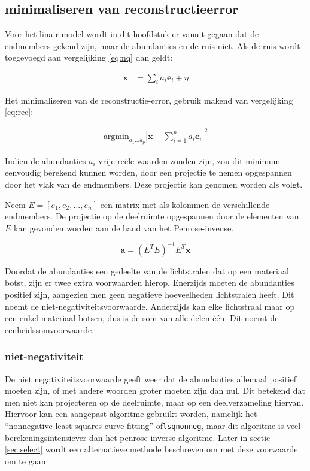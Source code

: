 \documentclass[12pt]{report}
\begin{document}
\subsection{minimaliseren van reconstructieerror}
Voor het linair model wordt in dit hoofdstuk er vanuit gegaan dat de endmembers gekend zijn, maar de abundanties en de ruis niet. Als de ruis wordt toegevoegd aan vergelijking \ref{eq:nq} dan geldt:

\begin{align}
\bm{x} &= \sum_i a_i \bm{e}_i + \eta
\end{align}

Het minimaliseren van de reconstructie-error, gebruik makend van vergelijking \ref{eq:rec}:

\begin{align}
\text{argmin}_{a_1 ... a_p} \left| \bm{x} - \sum_{i=1}^p a_i \bm{e}_i\right|^2
\end{align}

Indien de abundanties $a_i$ vrije re\"ele waarden zouden zijn, zou dit minimum eenvoudig berekend kunnen worden, door een projectie te nemen opgespannen door het vlak van de endmembers. Deze projectie kan genomen worden als volgt.

Neem $E = [e_1,e_2,...,e_n]$ een matrix met als kolommen de verschillende endmembers. De projectie op de deelruimte opgespannen door de elementen van $E$ kan gevonden worden aan de hand van het Penrose-invense.

\begin{equation}
\bm{a} = (E^T E)^{-1} E^T \bm{x}
\end{equation}

Doordat de abundanties een gedeelte van de lichtstralen dat op een materiaal botst, zijn er twee extra voorwaarden hierop. Enerzijds moeten de abundanties positief zijn, aangezien men geen negatieve hoeveelheden lichtstralen heeft. Dit noemt de niet-negativiteitsvoorwaarde. Anderzijds kan elke lichtstraal maar op een enkel materiaal botsen, dus is de som van alle delen \'e\'en. Dit noemt de eenheidssomvoorwaarde.  


\subsubsection{niet-negativiteit}

De niet negativiteitsvoorwaarde geeft weer dat de abundanties allemaal positief moeten zijn, of met andere woorden groter moeten zijn dan nul. Dit betekend dat men niet kan projecteren op de deelruimte, maar op een deelverzameling hiervan. Hiervoor kan een aangepast algoritme gebruikt worden, namelijk het ``nonnegative least-squares curve fitting'' of\texttt{lsqnonneg}, maar dit algoritme is veel berekeningsintensiever dan het penrose-inverse algoritme. Later in sectie \ref{sec:select} wordt een alternatieve methode beschreven om met deze voorwaarde om te gaan.
\end{document}
